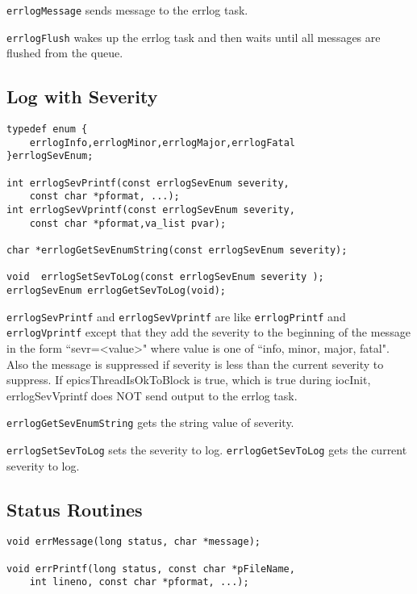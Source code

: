 \verb|errlogMessage| sends message to the errlog task.

\verb|errlogFlush| wakes up the errlog task and then waits until all messages are flushed from the queue.

\subsection{Log with Severity}

\begin{verbatim}
typedef enum {
    errlogInfo,errlogMinor,errlogMajor,errlogFatal
}errlogSevEnum;

int errlogSevPrintf(const errlogSevEnum severity,
    const char *pformat, ...);
int errlogSevVprintf(const errlogSevEnum severity,
    const char *pformat,va_list pvar);

char *errlogGetSevEnumString(const errlogSevEnum severity);

void  errlogSetSevToLog(const errlogSevEnum severity );
errlogSevEnum errlogGetSevToLog(void);
\end{verbatim}

\verb|errlogSevPrintf| and \verb|errlogSevVprintf| are like \verb|errlogPrintf| and  \verb|errlogVprintf| except that they 
add the severity to the beginning of the message in the form ``sevr=\textless{}value\textgreater{}" where value is one of ``info, minor, major, 
fatal". Also the message is suppressed if  severity is less than the current severity to suppress. If epicsThreadIsOkToBlock 
is true, which is true during iocInit, errlogSevVprintf does NOT send output to the errlog task.

\verb|errlogGetSevEnumString| gets the string value of severity. 

 \verb|errlogSetSevToLog| sets the severity to log. \verb|errlogGetSevToLog| gets the current severity to log.

\subsection{Status Routines }

\begin{verbatim}
void errMessage(long status, char *message);

void errPrintf(long status, const char *pFileName,
    int lineno, const char *pformat, ...);
\end{verbatim}


